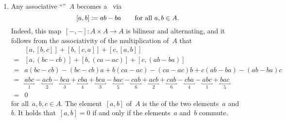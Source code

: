 \begin{examples}
  \label{examples for lie algebras}
  \leavevmode
  \begin{enumerate}
    \item
      Any associative \enquote{\algebra{$\kf$}}~$A$ becomes a~{\liealgebra{$\kf$}} via
      \[
        [a,b]
        \coloneqq
        ab - ba
        \qquad
        \text{for all~$a, b \in A$.}
      \]
      Indeed, this map~$[-, -] \colon A \times A \to A$ is bilinear and alternating, and it follows from the associativity of the multiplication of~$A$ that
      \begin{align*}
         {}&  [a,[b,c]] + [b,[c,a]] + [c,[a,b]] \\
        ={}&  [a, (bc-cb)] + [b, (ca-ac)] + [c, (ab-ba)] \\
        ={}&  a(bc-cb)-(bc-cb)a + b(ca-ac) - (ca-ac)b + c(ab-ba) - (ab-ba)c \\
        ={}&  \underbracket{abc}_{1}
              - \underbracket{acb}_{2}
              - \underbracket{bca}_{3}
              + \underbracket{cba}_{4}
              + \underbracket{bca}_{3}
              - \underbracket{bac}_{5}
              - \underbracket{cab}_{6}
              + \underbracket{acb}_{2}
              + \underbracket{cab}_{6}
              - \underbracket{cba}_{4}
              - \underbracket{abc}_{1}
              + \underbracket{bac}_{5} \\
        ={}&  0
      \end{align*}
      for all~$a, b, c \in A$.
      The element~$[a,b]$ of~$A$ is the  of the two elements~$a$ and~$b$.
      It holds that~$[a, b] = 0$ if and only if the elements~$a$ and~$b$ commute.


\end{enumerate}
\end{examples}
